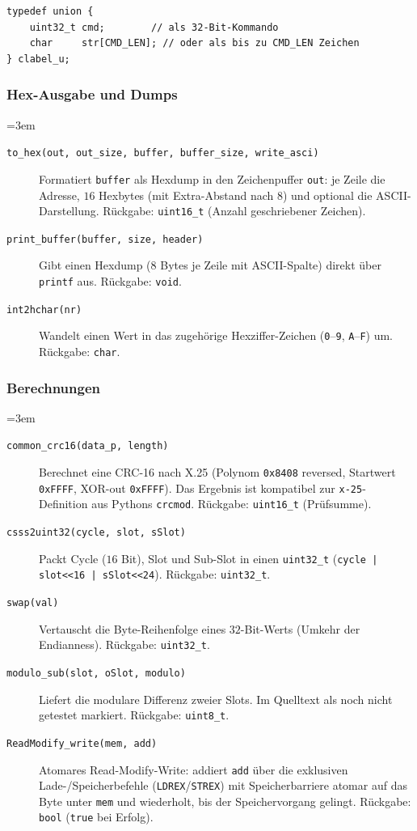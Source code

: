 \begin{listing}
\begin{verbatim}
typedef union {
    uint32_t cmd;        // als 32-Bit-Kommando
    char     str[CMD_LEN]; // oder als bis zu CMD_LEN Zeichen
} clabel_u;
\end{verbatim}
\caption{Label-/Kommando-Union \texttt{clabel\_u}}
\label{clabel_u}
\end{listing}

\subsubsection*{Hex-Ausgabe und Dumps}
{\sloppy\emergencystretch=3em
\begin{description}
\item[\texttt{to\_hex(out, out\_size, buffer, buffer\_size, write\_asci)}]
  Formatiert \verb|buffer| als Hexdump in den Zeichenpuffer \verb|out|: je
  Zeile die Adresse, $16$ Hexbytes (mit Extra-Abstand nach $8$) und optional
  die ASCII-Darstellung. Rückgabe: \verb|uint16_t| (Anzahl geschriebener
  Zeichen).
\item[\texttt{print\_buffer(buffer, size, header)}] Gibt einen Hexdump
  ($8$ Bytes je Zeile mit ASCII-Spalte) direkt über \verb|printf| aus.
  Rückgabe: \verb|void|.
\item[\texttt{int2hchar(nr)}] Wandelt einen Wert in das zugehörige
  Hexziffer-Zeichen (\texttt{0}--\texttt{9}, \texttt{A}--\texttt{F}) um.
  Rückgabe: \verb|char|.
\end{description}
\par}

\subsubsection*{Berechnungen}
{\sloppy\emergencystretch=3em
\begin{description}
\item[\texttt{common\_crc16(data\_p, length)}] Berechnet eine CRC-16 nach
  X.25 (Polynom \verb|0x8408| reversed, Startwert \verb|0xFFFF|, XOR-out
  \verb|0xFFFF|). Das Ergebnis ist kompatibel zur \verb|x-25|-Definition aus
  Pythons \verb|crcmod|. Rückgabe: \verb|uint16_t| (Prüfsumme).
\item[\texttt{csss2uint32(cycle, slot, sSlot)}] Packt Cycle ($16$ Bit), Slot
  und Sub-Slot in einen \verb|uint32_t| (\verb!cycle | slot<<16 | sSlot<<24!).
  Rückgabe: \verb|uint32_t|.
\item[\texttt{swap(val)}] Vertauscht die Byte-Reihenfolge eines
  $32$-Bit-Werts (Umkehr der Endianness). Rückgabe: \verb|uint32_t|.
\item[\texttt{modulo\_sub(slot, oSlot, modulo)}] Liefert die modulare Differenz
  zweier Slots. Im Quelltext als noch nicht getestet markiert. Rückgabe:
  \verb|uint8_t|.
\item[\texttt{ReadModify\_write(mem, add)}] Atomares Read-Modify-Write:
  addiert \verb|add| über die exklusiven Lade-/Speicherbefehle
  (\verb|LDREX|/\verb|STREX|) mit Speicherbarriere atomar auf das Byte unter
  \verb|mem| und wiederholt, bis der Speichervorgang gelingt. Rückgabe:
  \verb|bool| (\verb|true| bei Erfolg).
\end{description}
\par}

